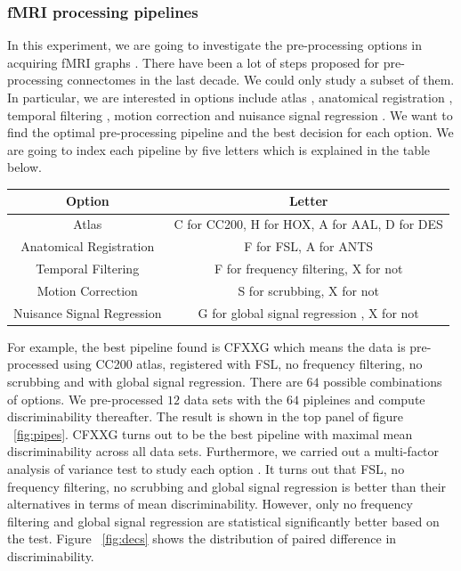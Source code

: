 \documentclass{article}
\begin{document}
\subsubsection{fMRI processing pipelines}
In this experiment, we are going to investigate the pre-processing options in acquiring fMRI graphs \cite{huettel2004functional}. There have been a lot of steps proposed for pre-processing connectomes in the last decade. We could only study a subset of them. In particular, we are interested in options include atlas \cite{mai2015atlas}, anatomical registration \cite{klein2009evaluation}, temporal filtering \cite{smith1999investigation}, motion correction \cite{power2012spurious} and nuisance signal regression \cite{fox2009global}. We want to find the optimal pre-processing pipeline and the best decision for each option. We are going to index each pipeline by five letters which is explained in the table below.   
\begin{center}
	\begin{tabular}{ |c|c| } 
		\hline
		Option & Letter  \\ \hline
		Atlas & C for CC200, H for HOX, A for AAL, D for DES \cite{craddock2012whole}\cite{desikan2006automated} \\ \hline
		Anatomical Registration & F for FSL, A for ANTS \cite{andersson2007non}\cite{avants2009advanced}\\ \hline
		Temporal Filtering & F for frequency filtering, X for not  \cite{smith1999investigation}\\ \hline
		Motion Correction & S for scrubbing, X for not  \cite{power2012spurious} \\ \hline
		Nuisance Signal Regression & G for global signal regression , X for not \cite{fox2009global} \\ \hline
	\end{tabular}
\end{center}
For example, the best pipeline found is CFXXG which means the data is pre-processed using CC200 atlas, registered with FSL, no frequency filtering, no scrubbing and with global signal regression. There are $64$ possible combinations of options. We pre-processed $12$ data sets with the $64$ pipleines and compute discriminability thereafter. The result is shown in the top panel of figure ~\ref{fig:pipes}. CFXXG turns out to be the best pipeline with maximal mean discriminability across all data sets. Furthermore, we carried out a multi-factor analysis of variance test to study each option \cite{hair2009multivariate}. It turns out that FSL, no frequency filtering, no scrubbing and global signal regression is better than their alternatives in terms of mean discriminability. However, only no frequency filtering and global signal regression are statistical significantly better based on the test. Figure ~\ref{fig:decs} shows the distribution of paired difference in discriminability.
\end{document}
